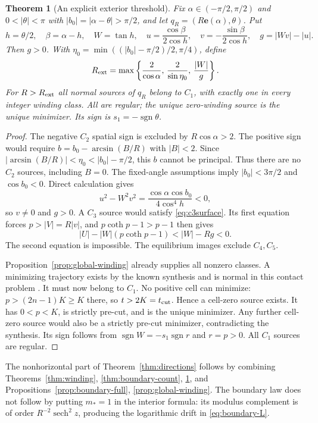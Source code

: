 \documentclass[11pt,a4paper]{article}
\newtheorem{theorem}{Theorem}[section]
\theoremstyle{remark}\newtheorem{remark}[theorem]{Remark}
\newcommand{\ee}{\mathbf e}
\begin{document}
\begin{theorem}[An explicit exterior threshold]\label{thm:exterior}
Fix $\alpha\in(-\pi/2,\pi/2)$ and $0<|\theta|<\pi$ with
$|b_0|=|\alpha-\theta|>\pi/2$, and let
$q_R=(R\ee(\alpha),\theta)$. Put
\[
 h=\theta/2,\quad\beta=\alpha-h,\quad W=\tan h,\quad
 u=\frac{\cos\beta}{2\cos h},\quad v=-\frac{\sin\beta}{2\cos h},
 \quad g=|Wv|-|u|.
\]
Then $g>0$. With
$\eta_0=\min((|b_0|-\pi/2)/2,\pi/4)$, define
\begin{equation}\label{eq:exterior-radius}
 R_{\rm ext}=
 \max\left\{\frac2{\cos\alpha},\,
             \frac2{\sin\eta_0},\,\frac{|W|}{g}\right\}.
\end{equation}
For $R>R_{\rm ext}$ all normal sources of $q_R$ belong to $C_1$,
with exactly one in every integer winding class.
All are regular; the unique zero-winding source is the unique
minimizer. Its sign is $s_1=-\operatorname{sgn}\theta$.
\end{theorem}
\begin{proof}
The negative $C_2$ spatial sign is excluded by $R\cos\alpha>2$.
The positive sign would require
$b=b_0-\arcsin(B/R)$ with $|B|<2$.
Since $|\arcsin(B/R)|<\eta_0<|b_0|-\pi/2$,
this $b$ cannot be principal. Thus there are no $C_2$ sources,
including $B=0$.
The fixed-angle assumptions imply $|b_0|<3\pi/2$ and
$\cos b_0<0$. Direct calculation gives
\[
 u^2-W^2v^2=\frac{\cos\alpha\cos b_0}{4\cos^4h}<0,
\]
so $v\ne0$ and $g>0$.
A $C_3$ source would satisfy \eqref{eq:c3surface}.
Its first equation forces $p>|V|=R|v|$, and
$p\coth p-1>p-1$ then gives
\[
 |U|-|W|(p\coth p-1)<|W|-Rg<0.
\]
The second equation is impossible. The equilibrium images exclude
$C_4,C_5$.

Proposition~\ref{prop:global-winding} already supplies all nonzero
classes. A minimizing trajectory exists by the known synthesis and
is normal in this contact problem \cite{ABB}. It must now belong to $C_1$.
No positive cell can minimize: $p>(2n-1)K\ge K$ there, so
$t>2K=t_{\rm cut}$. Hence a cell-zero source exists.
It has $0<p<K$, is strictly pre-cut, and is the unique minimizer.
Any further cell-zero source would also be a strictly pre-cut
minimizer, contradicting the synthesis. Its sign follows from
$\operatorname{sgn}W=-s_1\operatorname{sgn}r$ and $r=p>0$.
All $C_1$ sources are regular.
\end{proof}

The nonhorizontal part of Theorem~\ref{thm:directions} follows by combining
Theorems~\ref{thm:winding}, \ref{thm:boundary-count},
\ref{thm:exterior}, and Propositions~\ref{prop:boundary-full},
\ref{prop:global-winding}.
The boundary law does not follow by putting $m_*=1$ in the
interior formula: its modulus complement is of order
$R^{-2}\operatorname{sech}^2z$, producing the logarithmic drift
in \eqref{eq:boundary-L}.
\end{document}
